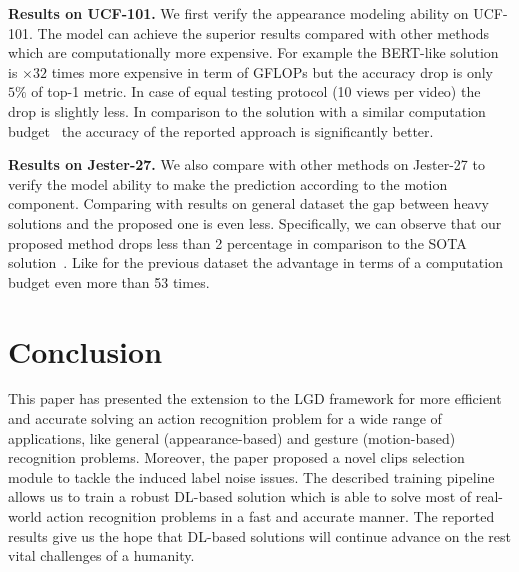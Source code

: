 \documentclass[twoside, twocolumn]{article}
\begin{document}
\textbf{Results on UCF-101.} We first verify the appearance modeling ability on UCF-101. The model can achieve the
superior results compared with other methods which are computationally more expensive. For example the BERT-like
solution~\cite{Bert} is $\times 32$ times more expensive in term of GFLOPs but the accuracy drop is only $5\%$ of top-1
metric. In case of equal testing protocol (10 views per video) the drop is slightly less. In comparison to the solution
with a similar computation budget~\cite{3DMob} the accuracy of the reported approach is significantly better.

\textbf{Results on Jester-27.} We also compare with other methods on Jester-27 to verify the model ability to make the
prediction according to the motion component. Comparing with results on general dataset the gap between heavy solutions
and the proposed one is even less. Specifically, we can observe that our proposed method drops less than 2 percentage in
comparison to the SOTA solution~\cite{PAN}. Like for the previous dataset the advantage in terms of a computation budget
even more than 53 times.



\section{Conclusion}

\lettrine[nindent=0em,lines=3]{T}{}his paper has presented the extension to the LGD framework for more efficient and
accurate solving an action recognition problem for a wide range of applications, like general (appearance-based) and
gesture (motion-based) recognition problems. Moreover, the paper proposed a novel clips selection module to tackle
the induced label noise issues. The described training pipeline allows us to train a robust DL-based solution which is able
to solve most of real-world action recognition problems in a fast and accurate manner. The reported results give us the
hope that DL-based solutions will continue advance on the rest vital challenges of a humanity.





\end{document}
